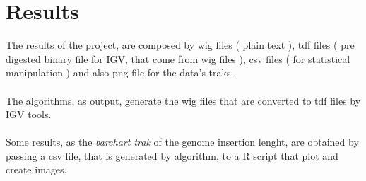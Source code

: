 \section{Results}

The results of the project, are composed by wig files ( plain text ), tdf files ( pre digested binary file for IGV, that come from wig files ), csv files ( for statistical manipulation ) and also png file for the data's traks.\\\\

The algorithms, as output, generate the wig files that are converted to tdf files by IGV tools.\\\\

Some results, as the \emph{barchart trak} of the genome insertion lenght, are obtained by passing a csv file, that is generated by algorithm, to a R script that plot and create images.